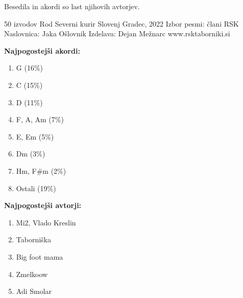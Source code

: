 \thispagestyle{empty}

\setlength\columnsep{40pt}

\vspace*{\fill}

\begin{multicols}{2}
	\vspace*{\fill}

	Besedila in akordi so last njihovih avtorjev.\linebreak\linebreak

	50 izvodov\linebreak
	Rod Severni kurir\linebreak
	Slovenj Gradec, 2022\linebreak\linebreak
	Izbor pesmi: člani RSK\linebreak
	Naslovnica: Jaka Ošlovnik\linebreak
	Izdelava: Dejan Mežnarc\linebreak\linebreak
	www.rsktaborniki.si
	\columnbreak

	\vspace*{\fill}
	\textbf{Najpogostejši akordi:}
	\begin{enumerate}
		\itemsep0em
		\item G (16\%)
		\item C (15\%)
		\item D (11\%)
		\item F, A, Am (7\%)
		\item E, Em (5\%)
		\item Dm (3\%)
		\item Hm, F#m (2\%)
		\item Ostali (19\%)
	\end{enumerate}

	\textbf{\linebreak Najpogostejši avtorji:}
	\begin{enumerate}
		\itemsep0em
		\item Mi2, Vlado Kreslin
		\item Taborniška
		\item Big foot mama
		\item Zmelkoow
		\item Adi Smolar
	\end{enumerate}



\end{multicols}
